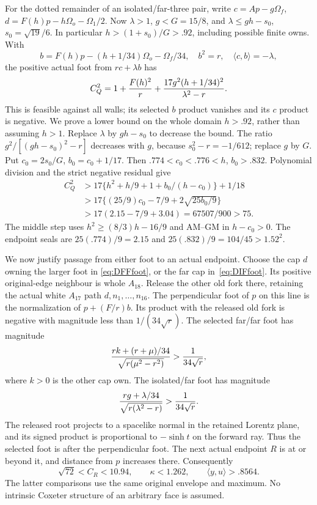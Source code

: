 \documentclass[11pt]{article}
\theoremstyle{definition}
\theoremstyle{remark}
\newcommand{\ip}[2]{\langle #1,#2\rangle}
\begin{document}
For the dotted remainder of an isolated/far-three pair,
write \(c=Ap-g\Omega_f\), \(d=F(h)p-h\Omega_o-\Omega_1/2\).
Now \(\lambda>1\), \(g<G=15/8\), and
\(\lambda\le gh-s_0\), \(s_0=\sqrt{19}/6\).
In particular \(h>(1+s_0)/G>.92\), including possible finite owns.
With
\[
 b=F(h)p-(h+1/34)\Omega_o-\Omega_f/34,\quad b^2=r,\quad
 \ip cb=-\lambda,
\]
the positive actual foot from \(rc+\lambda b\) has
\[
 C_Q^2=1+{F(h)^2\over r}
           +{17g^2(h+1/34)^2\over\lambda^2-r}.
\]
This is feasible against all walls; its selected \(b\) product
vanishes and its \(c\) product is negative.
We prove a lower bound on the whole domain \(h>.92\),
rather than assuming \(h>1\).
Replace \(\lambda\) by \(gh-s_0\) to decrease the bound.
The ratio \(g^2/[(gh-s_0)^2-r]\) decreases with \(g\),
because \(s_0^2-r=-1/612\); replace \(g\) by \(G\).
Put \(c_0=2s_0/G\), \(b_0=c_0+1/17\).
Then \(.774<c_0<.776<h\), \(b_0>.832\).
Polynomial division and the strict negative residual give
\[
 \begin{split}
 C_Q^2&>17\{h^2+h/9+1+b_0/(h-c_0)\}+1/18\\
 &>17\{(25/9)c_0-7/9+2\sqrt{25b_0/9}\}\\
 &>17(2.15-7/9+3.04)=67507/900>75.
 \end{split}
\tag{DIFfoot}\label{eq:DIFfoot}
\]
The middle step uses \(h^2\ge(8/3)h-16/9\) and
AM--GM in \(h-c_0>0\).
The endpoint seals are \(25(.774)/9=2.15\) and
\(25(.832)/9=104/45>1.52^2\).

We now justify passage from either foot to an actual endpoint.
Choose the cap \(d\) owning the larger foot in
\eqref{eq:DFFfoot}, or the far cap in~\eqref{eq:DIFfoot}.
Its positive original-edge neighbour is whole \(A_{18}\).
Release the other old fork there, retaining the actual white
\(A_{17}\) path \(d,n_1,\ldots,n_{16}\).
The perpendicular foot of \(p\) on this line is the normalization of
\(p+(F/r)b\).
Its product with the released old fork is negative with magnitude
less than \(1/(34\sqrt r)\).
The selected far/far foot has magnitude
\[
 {rk+(r+\mu)/34\over\sqrt{r(\mu^2-r^2)}}
                  >{1\over34\sqrt r},
\]
where \(k>0\) is the other cap own.
The isolated/far foot has magnitude
\[
 {rg+\lambda/34\over\sqrt{r(\lambda^2-r)}}
                  >{1\over34\sqrt r}.
\]
The released root projects to a spacelike normal in the retained
Lorentz plane, and its signed product is proportional to
\(-\sinh t\) on the forward ray.
Thus the selected foot is after the perpendicular foot.
The next actual endpoint \(R\) is at or beyond it, and distance
from \(p\) increases there.  Consequently
\[
 \sqrt{72}<C_R<10.94,\qquad
 \kappa<1.262,\qquad\ip yu>.8564.
\tag{DFexit}\label{eq:DFexit}
\]
The latter comparisons use the same original envelope and maximum.
No intrinsic Coxeter structure of an arbitrary face is assumed.
\end{document}
